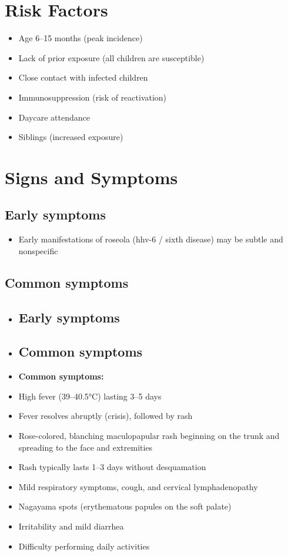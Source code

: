 \section{Risk Factors}

\begin{itemize}[noitemsep]
  \item Age 6--15 months (peak incidence)
  \item Lack of prior exposure (all children are susceptible)
  \item Close contact with infected children
  \item Immunosuppression (risk of reactivation)
  \item Daycare attendance
  \item Siblings (increased exposure)
\end{itemize}

\section{Signs and Symptoms}

\subsection{Early symptoms}
\begin{itemize}[noitemsep]
  \item Early manifestations of roseola (hhv-6 / sixth disease) may be subtle and nonspecific
\end{itemize}

\subsection{Common symptoms}
\begin{itemize}[noitemsep]
  \item \subsection{Early symptoms}
  \item \subsection{Common symptoms}
  \item \textbf{Common symptoms:}
  \item High fever (39--40.5°C) lasting 3--5 days
  \item Fever resolves abruptly (crisis), followed by rash
  \item Rose-colored, blanching maculopapular rash beginning on the trunk and spreading to the face and extremities
  \item Rash typically lasts 1--3 days without desquamation
  \item Mild respiratory symptoms, cough, and cervical lymphadenopathy
  \item Nagayama spots (erythematous papules on the soft palate)
  \item Irritability and mild diarrhea
  \item Difficulty performing daily activities
\end{itemize}

